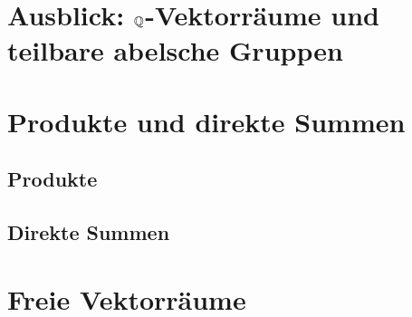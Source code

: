 \section{Ausblick: \texorpdfstring{$\mathbb{Q}$}{Q}-Vektorräume und teilbare abelsche Gruppen}



\section{Produkte und direkte Summen}


\subsection{Produkte}


\subsection{Direkte Summen}





\section{Freie Vektorräume}








